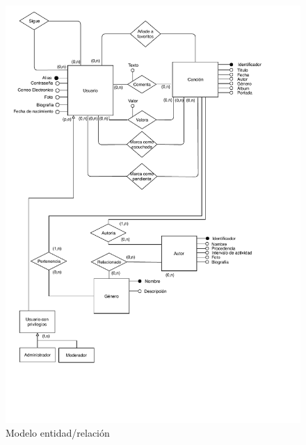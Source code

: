 \begin{figure}[H]
  \caption{Modelo entidad/relación}
  \centering
  \includegraphics[scale=0.7]{diagramas/modelo-e-r.pdf}
\end{figure}
